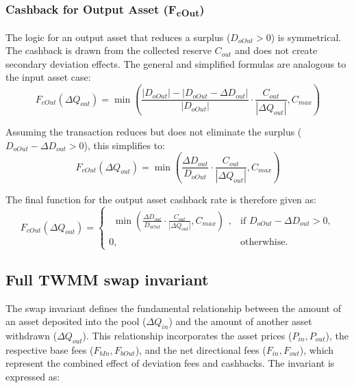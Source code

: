 \subsubsection{Cashback for Output Asset (F\textsubscript{cOut})}
The logic for an output asset that reduces a surplus ($D_{oOut} > 0$) is symmetrical. The cashback is drawn from the collected reserve $C_{out}$ and does not create secondary deviation effects. The general and simplified formulas are analogous to the input asset case:
\begin{equation}
	\label{eq:invariant_swap_cashback_out_function}
	F_{cOut}(\Delta Q_{out}) = \min\left(\frac{\lvert D_{oOut} \rvert - \lvert D_{oOut} - \Delta D_{out} \rvert}{ \lvert D_{oOut} \rvert} \cdot \frac{C_{out}}{|\Delta Q_{out}|}, C_{max}\right)
\end{equation}

Assuming the transaction reduces but does not eliminate the surplus ($D_{oOut} - \Delta D_{out} > 0$), this simplifies to:
\begin{equation}
	\label{eq:invariant_swap_cashback_out_function_simplified}
	F_{cOut}(\Delta Q_{out}) = \min\left(\frac{ \Delta D_{out}}{ D_{oOut}} \cdot \frac{C_{out}}{|\Delta Q_{out}|}, C_{max}\right)
\end{equation}

The final function for the output asset cashback rate is therefore given as:
\begin{equation}
	\label{eq:swap_invariant_cashback_out_function_final}
	F_{cOut}(\Delta Q_{out}) = \begin{cases}
		\begin{aligned} \min\left(\frac{ \Delta D_{out}}{ D_{oOut}} \cdot \frac{C_{out}}{|\Delta Q_{out}|}, C_{max}\right) \end{aligned}, & \text{if } D_{oOut} - \Delta D_{out} > 0, \\
		0, & \text{otherwhise.}
	\end{cases}	
\end{equation}

\subsection{Full TWMM swap invariant}
The swap invariant defines the fundamental relationship between the amount of an asset deposited into the pool ($\Delta Q_{in}$) and the amount of another asset withdrawn ($\Delta Q_{out}$). This relationship incorporates the asset prices ($P_{in}, P_{out}$), the respective base fees ($F_{bIn}, F_{bOut}$), and the net directional fees ($F_{in}, F_{out}$), which represent the combined effect of deviation fees and cashbacks. The invariant is expressed as:

